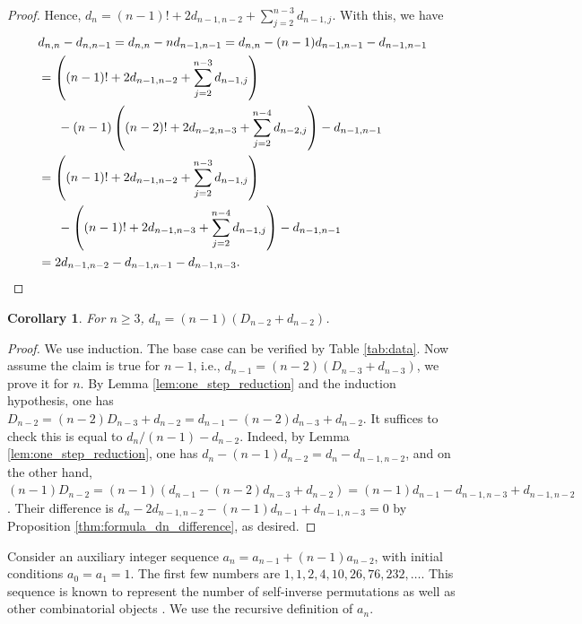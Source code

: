 \documentclass[reqno,11pt]{article} %
\newtheorem{corollary}[theorem]{Corollary}
\theoremstyle{remark}
\begin{document}
\begin{proof}
Hence, 
        $d_n
        = (n-1)! + 2d_{n-1,n-2} + \sum_{j=2}^{n-3} d_{n-1,j}$.
    With this, we have %
\begin{align*}
        &d_{n,n} - d_{n,n-1}= d_{n,n} - n d_{n-1,n-1} = d_{n,n} - (n-1) d_{n-1,n-1} - d_{n-1,n-1} \\
        &= \left( (n-1)! + 2d_{n-1,n-2} + \sum_{j=2}^{n-3} d_{n-1,j} \right) \\
        &\phantom{==} - (n-1) \left( (n-2)! + 2d_{n-2,n-3} + \sum_{j=2}^{n-4} d_{n-2,j} \right) 
        - d_{n-1,n-1}   \\
        &= \left( (n-1)! + 2d_{n-1,n-2} + \sum_{j=2}^{n-3} d_{n-1,j} \right) \\
        &\phantom{==} - \left( (n-1)! + 2d_{n-1,n-3} + \sum_{j=2}^{n-4} d_{n-1,j} \right)
        - d_{n-1,n-1}   \\
        &= 2d_{n-1,n-2} - d_{n-1,n-1} - d_{n-1,n-3}.	\qedhere
\end{align*}
\end{proof}




\begin{corollary}  \label{thm:formula_dn}
    For $n\ge 3$, 
        $d_n = (n-1)(D_{n-2} + d_{n-2})$.
\end{corollary}

\begin{proof}
	We use induction.  The base case can be verified by Table \ref{tab:data}. Now assume the claim is true for $n-1$, i.e., $d_{n-1} = (n-2)(D_{n-3} + d_{n-3})$, we prove it for $n$.  By Lemma \ref{lem:one_step_reduction} and the induction hypothesis, one has
       	$D_{n-2} = (n-2)D_{n-3} + d_{n-2}  = 	d_{n-1} - (n-2)d_{n-3} + 	d_{n-2}$.
	It suffices to check this is equal to
		$d_n/(n-1) - d_{n-2}$.
	Indeed, by Lemma \ref{lem:one_step_reduction}, one has
	$d_n - (n-1) d_{n-2} = d_n - d_{n-1, n-2}$,
and on the other hand, 
	$(n-1)D_{n-2} = (n-1)(d_{n-1} - (n-2)d_{n-3} + 	d_{n-2}) = (n-1)d_{n-1} - d_{n-1, n-3} + d_{n-1, n-2}$. 
Their difference is 
	$d_n - 2d_{n-1, n-2} - (n-1)d_{n-1} +d_{n-1, n-3} = 0$
by Proposition \ref{thm:formula_dn_difference}, as desired.
\end{proof}





Consider an auxiliary integer sequence $a_n = a_{n-1} + (n-1)a_{n-2}$, with initial conditions $a_0 = a_1 = 1$. The first few numbers  are $1, 1, 2, 4, 10, 26, 76, 232, \ldots$. This sequence is known to represent the number of self-inverse permutations as well as other  combinatorial objects \cite{oeis2024involutions}. We use  the recursive definition of $a_n$.
\end{document}
